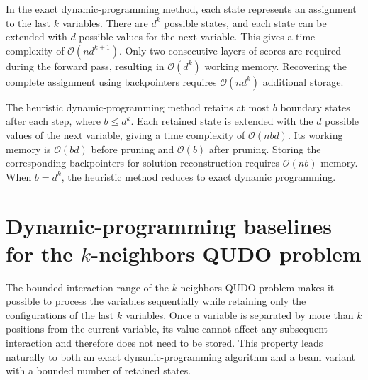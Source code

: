 \documentclass[%
 reprint,
 amsmath,amssymb,
 aps,
 pra,showkeys,
]{revtex4-2}
\begin{document}
In the exact dynamic-programming method, each state represents an
assignment to the last $k$ variables. There are $d^k$ possible states,
and each state can be extended with $d$ possible values for the next
variable. This gives a time complexity of
$\mathcal{O}(nd^{k+1})$. Only two consecutive layers of scores are
required during the forward pass, resulting in
$\mathcal{O}(d^k)$ working memory. Recovering the complete assignment
using backpointers requires $\mathcal{O}(nd^k)$ additional storage.

The heuristic dynamic-programming method retains at most $b$ boundary
states after each step, where $b\leq d^k$. Each retained state is
extended with the $d$ possible values of the next variable, giving a
time complexity of $\mathcal{O}(nbd)$. Its working memory is
$\mathcal{O}(bd)$ before pruning and $\mathcal{O}(b)$ after pruning.
Storing the corresponding backpointers for solution reconstruction
requires $\mathcal{O}(nb)$ memory. When $b=d^k$, the heuristic method
reduces to exact dynamic programming.

\section{Dynamic-programming baselines for the $k$-neighbors QUDO problem}\label{sec:dynamic-programming}

The bounded interaction range of the $k$-neighbors QUDO problem makes it
possible to process the variables sequentially while retaining only the
configurations of the last $k$ variables. Once a variable is separated by
more than $k$ positions from the current variable, its value cannot
affect any subsequent interaction and therefore does not need to be
stored. This property leads naturally to both an exact
dynamic-programming algorithm and a beam variant with a bounded
number of retained states.
\end{document}
